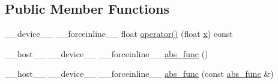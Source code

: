 \subsection*{Public Member Functions}
\begin{DoxyCompactItemize}
\item 
\-\_\-\-\_\-device\-\_\-\-\_\- \-\_\-\-\_\-forceinline\-\_\-\-\_\- float \hyperlink{structcv_1_1gpu_1_1device_1_1abs__func_3_01float_01_4_a2b7323b434bdbc1ced8bc221c72ec925}{operator()} (float \hyperlink{highgui__c_8h_a6150e0515f7202e2fb518f7206ed97dc}{x}) const 
\item 
\-\_\-\-\_\-host\-\_\-\-\_\- \-\_\-\-\_\-device\-\_\-\-\_\- \-\_\-\-\_\-forceinline\-\_\-\-\_\- \hyperlink{structcv_1_1gpu_1_1device_1_1abs__func_3_01float_01_4_a0f9a74672d4d8a235f858744b57e4b8a}{abs\-\_\-func} ()
\item 
\-\_\-\-\_\-host\-\_\-\-\_\- \-\_\-\-\_\-device\-\_\-\-\_\- \-\_\-\-\_\-forceinline\-\_\-\-\_\- \hyperlink{structcv_1_1gpu_1_1device_1_1abs__func_3_01float_01_4_af43171660ded84ec2b1a6edb8fb2dace}{abs\-\_\-func} (const \hyperlink{structcv_1_1gpu_1_1device_1_1abs__func}{abs\-\_\-func} \&)
\end{DoxyCompactItemize}


